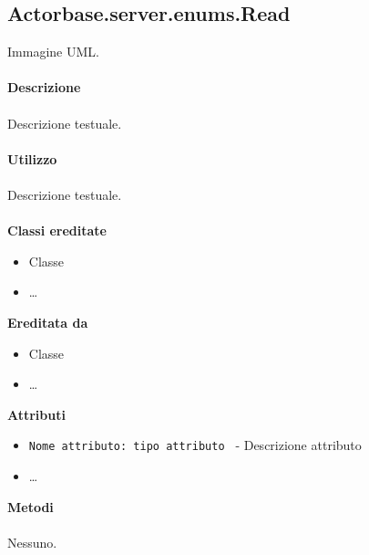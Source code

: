 \documentclass[a4paper]{article}
\begin{document}
	\subsection{Actorbase.server.enums.Read}
		Immagine UML.
		\\ \\
		\textbf{Descrizione}
			\\ \\
			Descrizione testuale.
			\\ \\
		\textbf{Utilizzo}
			\\ \\
			Descrizione testuale.
			\\ \\
		\textbf{Classi ereditate}
			\begin{itemize}
				\item Classe
				\item \dots
			\end{itemize}
		\textbf{Ereditata da}
			\begin{itemize}
				\item Classe
				\item \dots
			\end{itemize}
		\textbf{Attributi}
			\begin{itemize}
				\item \texttt{Nome attributo: tipo attributo } - Descrizione attributo
				\item \dots
			\end{itemize}
		\textbf{Metodi}
			\\ \\
			Nessuno.
			
\end{document}

